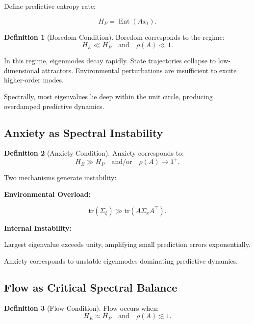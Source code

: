 \documentclass[12pt,a4paper]{article}
\theoremstyle{definition}
\newtheorem{definition}{Definition}[section]
\DeclareMathOperator{\Ent}{Ent}
\begin{document}
Define predictive entropy rate:

\begin{equation}
  H_P = \Ent(A x_t).
\end{equation}

\begin{definition}[Boredom Condition]
  Boredom corresponds to the regime:
  \begin{equation}
    H_E \ll H_P
    \quad \text{and} \quad
    \rho(A) \ll 1.
  \end{equation}
\end{definition}

In this regime, eigenmodes decay rapidly.
State trajectories collapse to low-dimensional attractors.
Environmental perturbations are insufficient to excite
higher-order modes.

Spectrally, most eigenvalues lie deep within the unit circle,
producing overdamped predictive dynamics.

\subsection{Anxiety as Spectral Instability}

\begin{definition}[Anxiety Condition]
  Anxiety corresponds to:
  \begin{equation}
    H_E \gg H_P
    \quad \text{and/or} \quad
    \rho(A) \to 1^+.
  \end{equation}
\end{definition}

Two mechanisms generate instability:

\textbf{Environmental Overload:}

\begin{equation}
  \mathrm{tr}(\Sigma_\xi)
  \gg
  \mathrm{tr}(A \Sigma_x A^\top).
\end{equation}

\textbf{Internal Instability:}

Largest eigenvalue exceeds unity,
amplifying small prediction errors exponentially.

Anxiety corresponds to unstable eigenmodes
dominating predictive dynamics.

\subsection{Flow as Critical Spectral Balance}

\begin{definition}[Flow Condition]
  Flow occurs when:
  \begin{equation}
    H_E \approx H_P
    \quad \text{and} \quad
    \rho(A) \lesssim 1.
  \end{equation}
\end{definition}
\end{document}
